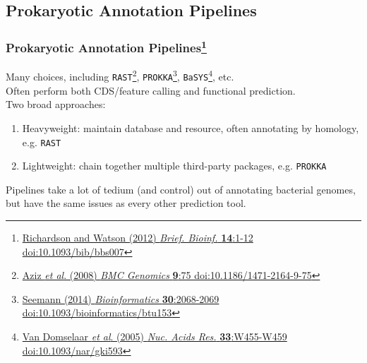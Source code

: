 
\subsection{Prokaryotic Annotation Pipelines}

\begin{frame}
  \frametitle{Prokaryotic Annotation Pipelines\footnote{\tiny{\href{http://dx.doi.org/10.1093/bib/bbs007}{Richardson and Watson (2012) \textit{Brief. Bioinf.} \textbf{14}:1-12 doi:10.1093/bib/bbs007}}}}
  Many choices, including \texttt{RAST}\footnote{\tiny{\href{http://dx.doi.org/10.1186/1471-2164-9-75}{Aziz \textit{et al}. (2008) \textit{BMC Genomics} \textbf{9}:75 doi:10.1186/1471-2164-9-75}}}, \texttt{PROKKA}\footnote{\tiny{\href{http://dx.doi.org/10.1093/bioinformatics/btu153}{Seemann (2014) \textit{Bioinformatics} \textbf{30}:2068-2069 doi:10.1093/bioinformatics/btu153}}}, \texttt{BaSYS}\footnote{\tiny{\href{http://dx.doi.org/10.1093/nar/gki593}{Van Domselaar \textit{et al}. (2005) \textit{Nuc. Acids Res.} \textbf{33}:W455-W459 doi:10.1093/nar/gki593}}}, etc.\\
  Often perform both CDS/feature calling and functional prediction.\\
  Two broad approaches:
  \begin{enumerate}
    \item Heavyweight: maintain database and resource, often annotating by homology, e.g. \texttt{RAST}
    \item Lightweight: chain together multiple third-party packages, e.g. \texttt{PROKKA}
  \end{enumerate}
  Pipelines take a lot of tedium (and control) out of annotating bacterial genomes, but have the same issues as every other prediction tool.
\end{frame}

